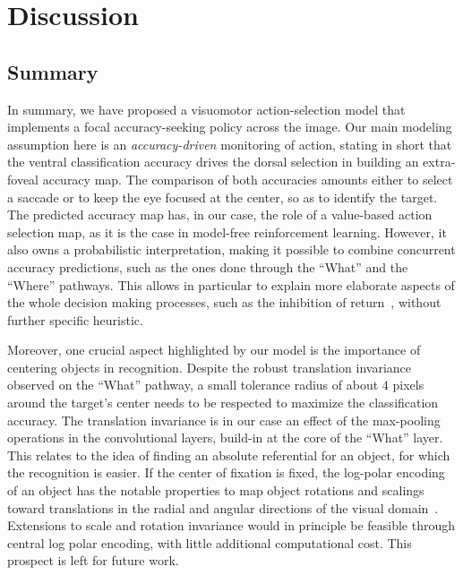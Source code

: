 \section{Discussion} \label{sec:discussion}
\subsection{Summary}
%
In summary, we have proposed a visuomotor action-selection model that implements a focal accuracy-seeking policy across the image. Our main modeling assumption here is an \emph{accuracy-driven} monitoring of action, stating in short that the ventral classification accuracy drives the dorsal selection in building an extra-foveal accuracy map. The comparison of both accuracies amounts either to select a saccade or to keep the eye focused at the center, so as to identify the target. The predicted accuracy map has, in our case, the role of a value-based action selection map, as it is the case in model-free reinforcement learning. However, it also owns a probabilistic interpretation, making it possible to combine concurrent accuracy predictions, such as the ones done through the ``What'' and the ``Where'' pathways. This allows in particular to explain more elaborate aspects of the whole decision making processes, such as the inhibition of return~\cite{Itti01}, without further specific heuristic.

Moreover, one crucial aspect highlighted by our model is the importance of centering objects in recognition. Despite the robust translation invariance observed on the ``What'' pathway, a small tolerance radius of about $4$ pixels around the target's center needs to be respected to maximize the classification accuracy. The translation invariance is in our case an effect of the max-pooling operations in the convolutional layers, build-in at the core of the ``What'' layer. This relates to the idea of finding an absolute referential for an object, for which the recognition is easier. If the center of fixation is fixed, the log-polar encoding of an object has the notable properties to map object rotations and scalings toward translations in the radial and angular directions of the visual domain~\cite{Traver10}. Extensions to scale and rotation invariance would in principle be feasible through central log polar encoding, with little additional computational cost. This prospect is left for future work.
%
